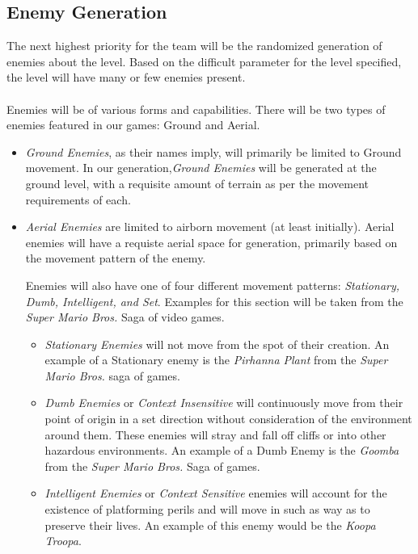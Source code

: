 \documentclass[pdftex,12pt,letter]{article}
\begin{document}
\subsection{Enemy Generation}
The next highest priority for the team will be the randomized generation of enemies about the level. Based on the difficult parameter for the level specified, the level will have many or few enemies present. 
\\\\
Enemies will be of various forms and capabilities. There will be two types of enemies featured in our games: Ground and Aerial. 
\begin{itemize}

\item \textit{Ground Enemies}, as their names imply, will primarily be limited to Ground movement. In our generation,\textit{Ground Enemies} will be generated at the ground level, with a requisite amount of terrain as per the movement requirements of each. 

\item \textit{Aerial Enemies} are limited to airborn movement (at least initially). Aerial enemies will have a requiste aerial space for generation, primarily based on the movement pattern of the enemy. \\

\endgroup


Enemies will also have one of four different movement patterns: \textit{Stationary, Dumb, Intelligent, and Set}. Examples for this section will be taken from the \textit{Super Mario Bros.} Saga of video games. 
\begin{itemize}

\item \textit{Stationary Enemies} will not move from the spot of their creation. An example of a Stationary enemy is the \textit{Pirhanna Plant} from the \textit{Super Mario Bros.} saga of games.

\item \textit{Dumb Enemies} or \textit{Context Insensitive} will continuously move from their point of origin in a set direction without consideration of the environment around them. These enemies will stray and fall off cliffs or into other hazardous environments. An example of a Dumb Enemy is the \textit{Goomba} from the \textit{Super Mario Bros.} Saga of games.

\item \textit{Intelligent Enemies} or \textit{Context Sensitive} enemies will account for the existence of platforming perils and will move in such as way as to preserve their lives. An example of this enemy would be the \textit{Koopa Troopa}.


\end{itemize}
\end{itemize}
\end{document}
